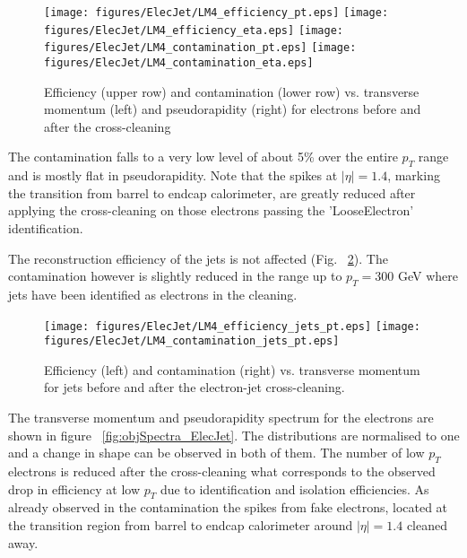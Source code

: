 \documentclass{cmspaper}
\begin{document}
\begin{figure}[hb]
\begin{center}
    \texttt{[image: figures/ElecJet/LM4\_efficiency\_pt.eps]}
    \texttt{[image: figures/ElecJet/LM4\_efficiency\_eta.eps]}
    \texttt{[image: figures/ElecJet/LM4\_contamination\_pt.eps]}
    \texttt{[image: figures/ElecJet/LM4\_contamination\_eta.eps]}
    \caption{Efficiency (upper row) and contamination (lower row) vs. transverse
    momentum (left) and pseudorapidity (right) for electrons before and after
    the cross-cleaning} \label{fig:effCont_elec_ElecJet}
\end{center}
\end{figure}

The contamination falls to a very low level of about 5\% over the entire $p_T$
range and is mostly flat in pseudorapidity. Note that the spikes at
$|\eta|=1.4$, marking the transition from barrel to endcap calorimeter, are
greatly reduced after applying the cross-cleaning on those electrons passing the
'LooseElectron' identification.

The reconstruction efficiency of the jets is not affected (Fig.
~\ref{fig:effCont_Jets_ElecJet}). The contamination however is slightly reduced
in the range up to $p_T=300$ GeV where jets have been identified as electrons in
the cleaning.
\begin{figure}[hb]
\begin{center}
    \texttt{[image: figures/ElecJet/LM4\_efficiency\_jets\_pt.eps]}
    \texttt{[image: figures/ElecJet/LM4\_contamination\_jets\_pt.eps]}
    \caption{Efficiency (left) and contamination (right) vs. transverse momentum
    for jets before and after the electron-jet cross-cleaning.}
\label{fig:effCont_Jets_ElecJet}
\end{center}
\end{figure}

The transverse momentum and pseudorapidity spectrum for the electrons are shown
in figure ~\ref{fig:objSpectra_ElecJet}. The distributions are normalised to one
and a change in shape can be observed in both of them. The number of low $p_T$
electrons is reduced after the cross-cleaning what corresponds to the observed
drop in efficiency at low $p_T$ due to identification and isolation
efficiencies. As already observed in the contamination the spikes from fake
electrons, located at the transition region from barrel to endcap calorimeter
around $|\eta|=1.4$ cleaned away.
\end{document}
